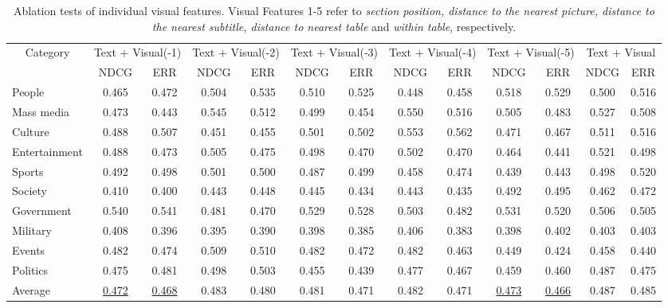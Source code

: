 \begin{table*}[]
\begin{tabular}{|l|cc|cc|cc|cc|cc|cc|}
\hline
\multicolumn{1}{|c|}{\multirow{2}{*}{Category}} & \multicolumn{2}{|c|}{Text + Visual(-1)} & \multicolumn{2}{|c|}{Text + Visual(-2)} & \multicolumn{2}{|c|}{Text + Visual(-3)} & \multicolumn{2}{|c|}{Text + Visual(-4)} & \multicolumn{2}{|c|}{Text + Visual(-5)} & \multicolumn{2}{|c|}{Text + Visual}\\
\multicolumn{1}{|l|}{} & \multicolumn{1}{|c}{NDCG} & \multicolumn{1}{c|}{ERR} & \multicolumn{1}{|c}{NDCG} & \multicolumn{1}{c|}{ERR} & \multicolumn{1}{|c}{NDCG} & \multicolumn{1}{c|}{ERR} & \multicolumn{1}{|c}{NDCG} & \multicolumn{1}{c|}{ERR} & \multicolumn{1}{|c}{NDCG} & \multicolumn{1}{c|}{ERR} & \multicolumn{1}{|c}{NDCG} & \multicolumn{1}{c|}{ERR}\\
\hline 
People & 0.465 & 0.472 & 0.504 & 0.535 & 0.510 & 0.525 & 0.448 & 0.458 & 0.518 & 0.529 & 0.500 & 0.516 \\

Mass media & 0.473 & 0.443 & 0.545 & 0.512 & 0.499 & 0.454 & 0.550 & 0.516 & 0.505 & 0.483 & 0.527 & 0.508 \\

Culture & 0.488 & 0.507 & 0.451 & 0.455 & 0.501 & 0.502 & 0.553 & 0.562 & 0.471 & 0.467 & 0.511 & 0.516 \\

Entertainment & 0.488 & 0.473 & 0.505 & 0.475 & 0.498 & 0.470 & 0.502 & 0.470 & 0.464 & 0.441 & 0.521 & 0.498 \\

Sports & 0.492 & 0.498 & 0.501 & 0.500 & 0.487 & 0.499 & 0.458 & 0.474 & 0.439 & 0.443 & 0.498 & 0.520 \\

Society & 0.410 & 0.400 & 0.443 & 0.448 & 0.445 & 0.434 & 0.443 & 0.435 & 0.492 & 0.495 & 0.462 & 0.472 \\

Government & 0.540 & 0.541 & 0.481 & 0.470 & 0.529 & 0.528 & 0.503 & 0.482 & 0.531 & 0.520 & 0.506 & 0.505 \\

Military & 0.408 & 0.396 & 0.395 & 0.390 & 0.398 & 0.385 & 0.406 & 0.383 & 0.398 & 0.402 & 0.403 & 0.403 \\

Events & 0.482 & 0.474 & 0.509 & 0.510 & 0.482 & 0.472 & 0.482 & 0.463 & 0.449 & 0.424 & 0.458 & 0.440 \\

Politics & 0.475 & 0.481 & 0.498 & 0.503 & 0.455 & 0.439 & 0.477 & 0.467 & 0.459 & 0.460 & 0.487 & 0.475 \\
\hline
Average & \underline{0.472} & \underline{0.468} & 0.483 & 0.480 & 0.481 & 0.471 & 0.482 & 0.471 & \underline{0.473} & \underline{0.466} & 0.487 & 0.485 \\
\hline               
\end{tabular}
\caption{Ablation tests of individual visual features. Visual Features 1-5 refer to \textit{section position, distance to the nearest picture, distance to the nearest subtitle, distance to nearest table} and \textit{within table}, respectively.}
\label{table_cmp4}
\end{table*}

